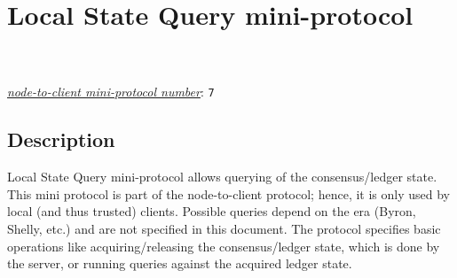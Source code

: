 \section{Local State Query mini-protocol}
\label{local-state-query-protocol}
\\
\\
\hyperref[table:node-to-client-protocol-numbers]{\textit{node-to-client mini-protocol number}}: \texttt{7}\\
\newcommand{\StAcquiring}{\state{Acquiring}}
\newcommand{\StAcquired}{\state{Acquired}}
\newcommand{\StQuerying}{\state{Querying}}
\newcommand{\MsgAcquire}{\msg{MsgAcquire}}
\newcommand{\MsgAcquired}{\msg{MsgAcquired}}
\newcommand{\MsgFailure}{\msg{MsgFailure}}
\newcommand{\MsgQuery}{\msg{MsgQuery}}
\newcommand{\MsgResult}{\msg{MsgResult}}
\newcommand{\MsgRelease}{\msg{MsgRelease}}
\newcommand{\MsgReAcquire}{\msg{MsgReAcquire}}

\subsection{Description}
Local State Query mini-protocol allows querying of the consensus/ledger state.
This mini protocol is part of the node-to-client protocol; hence, it is only
used by local (and thus trusted) clients.  Possible queries depend on the era
(Byron, Shelly, etc.) and are not specified in this document.  The protocol
specifies basic operations like acquiring/releasing the consensus/ledger
state, which is done by the server, or running queries against the acquired
ledger state.

